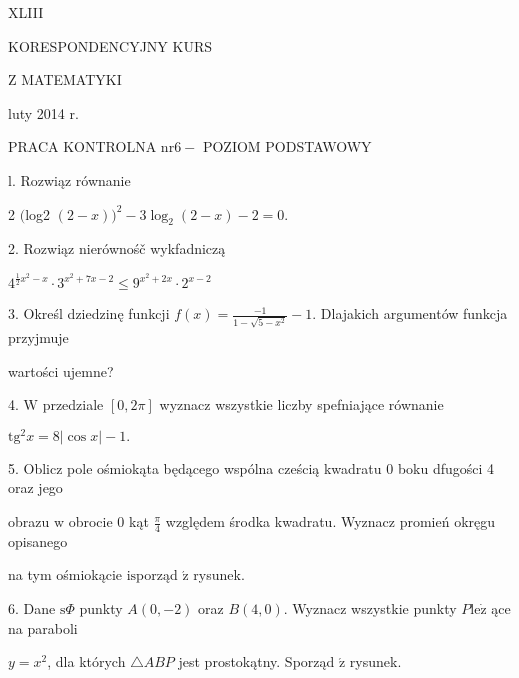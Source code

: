\documentclass[a4paper,12pt]{article}
\begin{document}
XLIII

KORESPONDENCYJNY KURS

Z MATEMATYKI

luty 2014 r.

PRACA KONTROLNA $\mathrm{n}\mathrm{r} 6-$ POZIOM PODSTAWOWY

l. Rozwiąz równanie

2 $($log2 $(2-x))^{2}-3\log_{2}(2-x)-2=0.$

2. Rozwiąz nierównośč wykfadniczą

$4^{\frac{1}{2}x^{2}-x}\cdot 3^{x^{2}+7x-2}\leq 9^{x^{2}+2x}\cdot 2^{x-2}$

3. Określ dziedzinę funkcji $f(x)=\displaystyle \frac{-1}{1-\sqrt{5-x^{2}}}-1$. Dlajakich argumentów funkcja przyjmuje

wartości ujemne?

4. $\mathrm{W}$ przedziale $[0,2\pi]$ wyznacz wszystkie liczby spefniające równanie

$\mathrm{t}\mathrm{g}^{2}x=8|\cos x|-1.$

5. Oblicz pole ośmiokąta będącego wspólna cześcią kwadratu $0$ boku dfugości 4 oraz jego

obrazu $\mathrm{w}$ obrocie $0$ kąt $\displaystyle \frac{\pi}{4}$ względem środka kwadratu. Wyznacz promień okręgu opisanego

na tym ośmiokącie $\mathrm{i}\mathrm{s}$porząd $\acute{\mathrm{z}}$ rysunek.

6. Dane $\mathrm{s}\Phi$ punkty $A(0,-2)$ oraz $B(4,0)$. Wyznacz wszystkie punkty $P\mathrm{l}\mathrm{e}\dot{\mathrm{z}}$ ące na paraboli

$y=x^{2}$, dla których $\triangle ABP$ jest prostokątny. Sporząd $\acute{\mathrm{z}}$ rysunek.
\end{document}
